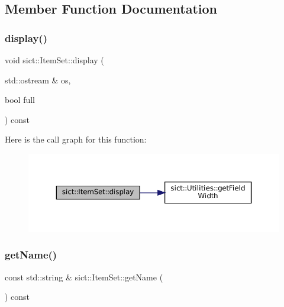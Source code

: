 \subsection{Member Function Documentation}
\mbox{\label{classsict_1_1ItemSet_af3328f8127c80b02ce738f27a7881635}} 
\subsubsection{\texorpdfstring{display()}{display()}}
{\footnotesize\ttfamily void sict\+::\+Item\+Set\+::display (\begin{DoxyParamCaption}\item[{std\+::ostream \&}]{os,  }\item[{bool}]{full }\end{DoxyParamCaption}) const}

Here is the call graph for this function\+:
\nopagebreak
\begin{figure}[H]
\begin{center}
\leavevmode
\includegraphics[width=350pt]{classsict_1_1ItemSet_af3328f8127c80b02ce738f27a7881635_cgraph}
\end{center}
\end{figure}
\mbox{\label{classsict_1_1ItemSet_a5182b65c6ac91c27a125641139b448cd}} 
\subsubsection{\texorpdfstring{getName()}{getName()}}
{\footnotesize\ttfamily const std\+::string \& sict\+::\+Item\+Set\+::get\+Name (\begin{DoxyParamCaption}{ }\end{DoxyParamCaption}) const}

\mbox{\label{classsict_1_1ItemSet_a207ec2d18000dba292c70b34617917d0}} 
